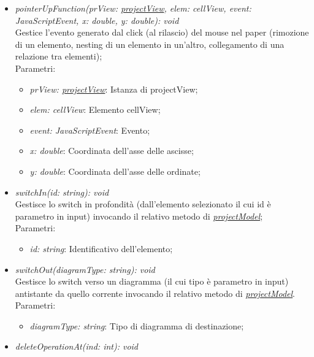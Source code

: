 \documentclass[../DefinizioneDiProdotto.tex]{subfiles}
\begin{document}
\begin{itemize}
\begin{itemize}
							\item \emph{pointerUpFunction(prView: \hyperlink{SWEDesigner::Client::View::projectView}{\emph{projectView}}, elem: cellView, event: JavaScriptEvent, x: double, y: double): void} \\
							Gestice l'evento generato dal click (al rilascio) del mouse nel paper (rimozione di un elemento, nesting di un elemento in un'altro, collegamento di una relazione tra elementi);\\
							Parametri:
							\begin{itemize}
								\item \emph{prView: \hyperlink{SWEDesigner::Client::View::projectView}{\emph{projectView}}}: Istanza di projectView;
								\item \emph{elem: cellView}: Elemento cellView;
								\item \emph{event: JavaScriptEvent}: Evento;
								\item \emph{x: double}: Coordinata dell'asse delle ascisse;
								\item \emph{y: double}: Coordinata dell'asse delle ordinate;
							\end{itemize}
							\item \emph{switchIn(id: string): void} \\
							Gestisce lo switch in profondità (dall'elemento selezionato il cui id è parametro in input) invocando il relativo metodo di \hyperlink{SWEDesigner::Model::projectModel}{\emph{projectModel}};\\
							Parametri:
							\begin{itemize}
								\item \emph{id: string}: Identificativo dell'elemento;
							\end{itemize}
							\item \emph{switchOut(diagramType: string): void} \\
							Gestisce lo switch verso un diagramma (il cui tipo è parametro in input) antistante da quello corrente invocando il relativo metodo di \hyperlink{SWEDesigner::Model::projectModel}{\emph{projectModel}}.\\
							Parametri:
							\begin{itemize}
								\item \emph{diagramType: string}: Tipo di diagramma di destinazione;
							\end{itemize}
							\item \emph{deleteOperationAt(ind: int): void} \\

\end{itemize}
\end{itemize}
\end{document}
